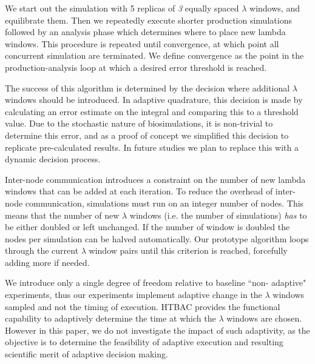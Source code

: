 We start out the simulation with 5 replicas of \emph{3} equally spaced
$\lambda$ windows, and equilibrate them. Then we repeatedly execute shorter
production simulations followed by an analysis phase which determines where
to place new lambda windows. This procedure is repeated until convergence, at
which point all concurrent simulation are terminated. We define convergence
as the point in the production-analysis loop at which a desired error
threshold is reached.

The success of this algorithm is determined by the decision where additional
$\lambda$ windows should be introduced. In adaptive quadrature, this decision
is made by calculating an error estimate on the integral and comparing this
to a threshold value. Due to the stochastic nature of biosimulations, it is
non-trivial to determine this error, and as a proof of concept we simplified
this decision to replicate pre-calculated results. In future studies we plan
to replace this with a dynamic decision process.

Inter-node communication introduces a constraint on the number of new lambda
windows that can be added at each iteration. To reduce the overhead of
inter-node communication, simulations must run on an integer number of nodes.
This means that the number of new $\lambda$ windows (i.e. the number of
simulations) \emph{has} to be either doubled or left unchanged. If the number
of window is doubled the nodes per simulation can be halved automatically.
Our prototype algorithm loops through the current $\lambda$ window pairs
until this criterion is reached, forcefully adding more if needed.




We introduce only a single degree of freedom relative to baseline ``non-
adaptive" experiments, thus our experiments implement adaptive change in the
$\lambda$ windows sampled and not the timing of execution. HTBAC provides the
functional capability to adaptively determine the time at which the $\lambda$
windows are chosen. However in this paper, we do not investigate the impact
of such adaptivity, as the objective is to determine the feasibility of
adaptive execution and resulting scientific merit of adaptive decision
making.

